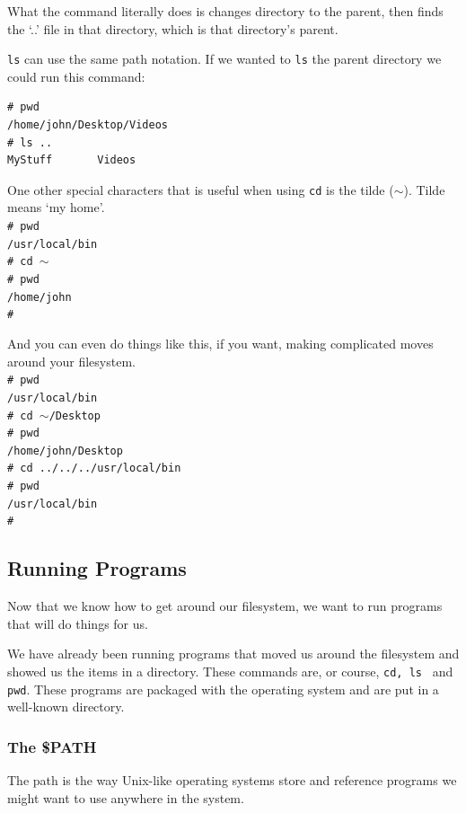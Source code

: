 What the command literally does is changes directory to the parent, 
then finds the `..' file in that directory, which is that directory's parent.

{\tt ls} can use the same path notation.  If we wanted to {\tt ls} the parent directory we 
could run this command:
{\tt \begin{verbatim}
# pwd
/home/john/Desktop/Videos
# ls ..
MyStuff       Videos        
\end{verbatim}
}

One other special characters that is useful when using {\tt cd} is the tilde ($\sim$). Tilde means `my home'.
{\tt \\    %
\# pwd \\
/usr/local/bin \\
\# cd $\sim$ \\
\# pwd \\
/home/john \\
\# \\

}
 
 
And you can even do things like this, if you want, making complicated moves
around your filesystem.
{\tt \\
\# pwd \\
/usr/local/bin \\
\# cd $\sim$/Desktop \\
\# pwd \\
/home/john/Desktop \\
\# cd ../../../usr/local/bin \\
\# pwd \\
/usr/local/bin \\
\# \\ 
}


\subsection{Running Programs}
Now that we know how to get around our filesystem, we want to run programs that
will do things for us.

We have already been running programs that moved us around the filesystem and showed us the items in a directory.  
These commands are, or course, {\tt cd, ls } and {\tt pwd}. These programs are packaged with the 
operating system and are put in a well-known directory.

\subsubsection{The \$PATH}
The path is the way Unix-like operating systems store and reference programs we might want
to use anywhere in the system.

